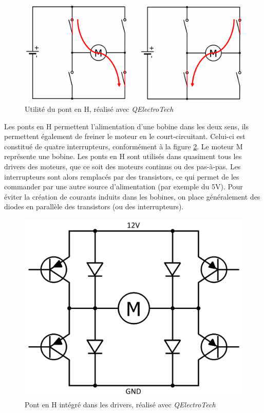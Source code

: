 \documentclass[12pt,a4paper]{report}
\begin{document}
\begin{figure}[!h]
 \center
 \includegraphics[scale=0.35]{../pictures/pontH.png}
 \caption{Utilité du pont en H, réalisé avec \emph{QElectroTech}}
 \label{pontH}
\end{figure}

Les ponts en H permettent l'alimentation d'une bobine dans les deux sens, ils permettent également de freiner le moteur en le court-circuitant. Celui-ci est constitué de quatre interrupteurs, conformément à la figure \ref{pontH}. Le moteur M représente une bobine. Les ponts en H sont utilisés dans quasiment tous les drivers des moteurs, que ce soit des moteurs continus ou des pas-à-pas. Les interrupteurs sont alors remplacés par des transistors, ce qui permet de les commander par une autre source d'alimentation (par exemple du 5V). Pour éviter la création de courants induits dans les bobines, on place généralement des diodes en parallèle des transistors (ou des interrupteurs). 

\begin{figure}[!h]
 \center
 \includegraphics[scale=0.2]{../pictures/pont_en_H.png}
 \caption{Pont en H intégré dans les drivers, réalisé avec \emph{QElectroTech}}
 \label{pontH}
\end{figure}
\end{document}
